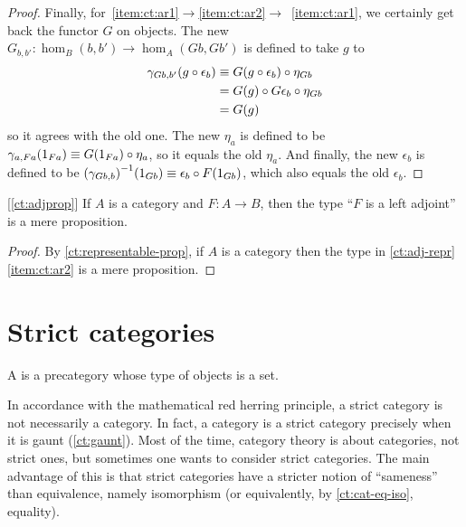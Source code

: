 \begin{proof}
  Finally, for~\ref{item:ct:ar1}$\to$\ref{item:ct:ar2}$\to$~\ref{item:ct:ar1}, we certainly get back the functor $G$ on objects.
  The new $G_{b,b'}:\hom_B(b,b') \to \hom_A(Gb,Gb')$ is defined to take $g$ to
  \begin{align*}
    \gamma_{G b, b'}(g \circ \epsilon_b)
    &\equiv G(g \circ \epsilon_b) \circ \eta_{Gb}\\
    &= G(g) \circ G\epsilon_b \circ \eta_{Gb}\\
    &= G(g)
  \end{align*}
  so it agrees with the old one.
  The new $\eta_a$ is defined to be $\gamma_{a,Fa}(1_{Fa}) \equiv G(1_{Fa}) \circ \eta_a$, so it equals the old $\eta_a$.
  And finally, the new $\epsilon_b$ is defined to be ${(\gamma_{Gb,b})}^{-1}(1_{Gb}) \equiv \epsilon_b \circ F(1_{Gb})$, which also equals the old $\epsilon_b$.
\end{proof}

\begin{cor}\label{ct:adjprop2}[\cref{ct:adjprop}]
  If $A$ is a category and $F:A\to B$, then the type ``$F$ is a left adjoint'' is a mere proposition.
\end{cor}
\begin{proof}
  By \cref{ct:representable-prop}, if $A$ is a category then the type in \cref{ct:adj-repr}\ref{item:ct:ar2} is a mere proposition.
\end{proof}


\section{Strict categories}
\label{sec:strict-categories}

%

\begin{defn}\label{ct:strict-category}
  A 
  is a precategory whose type of objects is a set.
\end{defn}

In accordance with the mathematical red herring principle, a strict category is not necessarily a category.
In fact, a category is a strict category precisely when it is gaunt (\cref{ct:gaunt}).
%
%
Most of the time, category theory is about categories, not strict ones, but sometimes one wants to consider strict categories.
The main advantage of this is that strict categories have a stricter notion of ``sameness'' than equivalence, namely isomorphism (or equivalently, by \cref{ct:cat-eq-iso}, equality).

